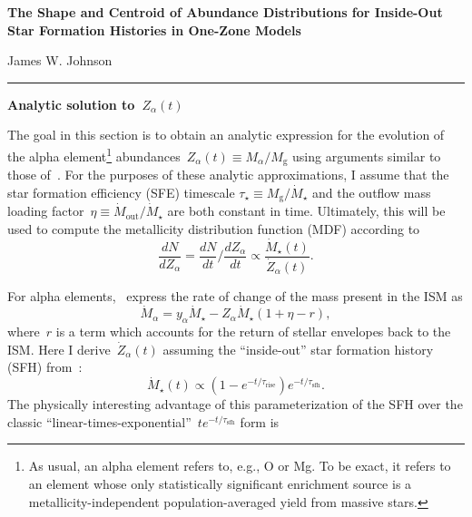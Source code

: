 \documentclass[12pt]{article}
\newcommand{\timescale}[1]{\ensuremath{\tau_\text{#1}}}
\begin{document}
\begin{center}
\textbf{The Shape and Centroid of Abundance Distributions for Inside-Out Star
Formation Histories in One-Zone Models}
\par\null\par
James W. Johnson
\par\null\par
\rule[0.7\baselineskip]{0.5\textwidth}{0.4pt}
\end{center}

\par\noindent
\textbf{Analytic solution to~$Z_\alpha(t)$}
\par\noindent
The goal in this section is to obtain an analytic expression for the evolution
of the alpha element\footnote{
	As usual, an alpha element refers to, e.g., O or Mg. To be exact, it refers
	to an element whose only statistically significant enrichment source is a
	metallicity-independent population-averaged yield from massive stars.
} abundances~$Z_\alpha(t) \equiv M_\alpha / M_\text{g}$ using arguments similar
to those of~\citet*{Weinberg2017}.
For the purposes of these analytic approximations, I assume that the star
formation efficiency (SFE) timescale
$\tau_\star \equiv M_\text{g} / \dot{M}_\star$ and the outflow mass loading
factor~$\eta \equiv \dot{M}_\text{out} / \dot{M}_\star$ are both constant in
time.
Ultimately, this will be used to compute the metallicity distribution function
(MDF) according to
\begin{equation}
\frac{dN}{dZ_\alpha} = \frac{dN}{dt}/\frac{dZ_\alpha}{dt}
\propto \frac{\dot{M}_\star(t)}{\dot{Z}_\alpha(t)}.
\label{dndz}
\end{equation}
\par
For alpha elements,~\citet*{Weinberg2017} express the rate of change of the
mass present in the ISM as
\begin{equation}
\dot{M}_\alpha = y_\alpha \dot{M}_\star - Z_\alpha \dot{M}_\star (1 + \eta - r),
\label{eq:mdot_alpha}
\end{equation}
where~$r$ is a term which accounts for the return of stellar envelopes back to
the ISM.
Here I derive~$\dot{Z}_\alpha(t)$ assuming the ``inside-out'' star formation
history (SFH) from~\citet{Johnson2021}:
\begin{equation}
\dot{M}_\star(t) \propto (1 - e^{-t / \timescale{rise}})
e^{-t / \timescale{sfh}}.
\label{eq:insideout_sfh}
\end{equation}
The physically interesting advantage of this parameterization of the SFH over
the classic ``linear-times-exponential''~$t e^{-t / \timescale{sfh}}$ form is
\end{document}
